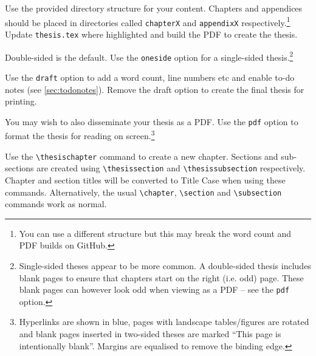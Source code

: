 
Use the provided directory structure for your content. Chapters and appendices should be
placed in directories called \texttt{chapterX} and \texttt{appendixX} respectively.\footnote{You
can use a different structure but this may break the word count and PDF builds on GitHub.}
Update \texttt{thesis.tex} where highlighted and build the PDF to create the thesis.


\begin{description}[leftmargin=!,labelwidth=\widthof{\tt oneside}]
  \item[\texttt{oneside}] Double-sided is the default. Use the \texttt{oneside} option for
  a single-sided thesis.\footnote{Single-sided theses appear to be more common. A double-sided
  thesis includes blank pages to ensure that chapters start on the right (i.e. odd) page.
  These blank pages can however look odd when viewing as a PDF -- see the \texttt{pdf} option.}
  \item[\texttt{draft}] Use the \texttt{draft} option to add a word count, line numbers etc
  and enable to-do notes (see \cref{sec:todonotes}). Remove the draft option to create the
  final thesis for printing.
  \item[\texttt{pdf}] You may wish to also disseminate your thesis as a PDF. Use the \texttt{pdf}
  option to format the thesis for reading on screen.\footnote{Hyperlinks are shown in blue,
  pages with landscape tables/figures are rotated and blank pages inserted in two-sided
  theses are marked ``This page is intentionally blank''. Margins are equalised to remove the
  binding edge.}
  \end{description}



Use the \verb|\thesischapter| command to create a new chapter. Sections and sub-sections
are created using \verb|\thesissection| and \verb|\thesissubsection| respectively.
Chapter and section titles will be converted to Title Case when using these commands.
Alternatively, the usual \verb|\chapter|, \verb|\section| and \verb|\subsection| commands
work as normal.

